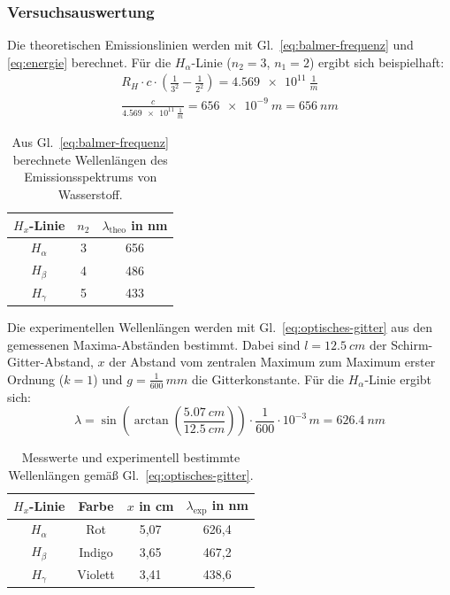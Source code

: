 \subsubsection{Versuchsauswertung}
Die theoretischen Emissionslinien werden mit Gl.~\eqref{eq:balmer-frequenz} und \eqref{eq:energie} berechnet. Für die $H_{\alpha}$-Linie ($n_{2}=3$, $n_1=2$) ergibt sich beispielhaft:
\begin{equation}
  \begin{aligned}
    R_{H} \cdot c \cdot \left(\frac{1}{3^{2}}-\frac{1}{2^{2}} \right) = \SI{4.569e11}{\frac{1}{m}} \\
    \frac{c}{\SI{4.569e11}{\frac{1}{m}}}= \SI{656e-9}{m}=\SI{656}{nm}
  \end{aligned}
\end{equation}

\begin{table}[H]
  \centering
  \caption{Aus Gl.~\eqref{eq:balmer-frequenz} berechnete Wellenlängen des Emissionsspektrums von Wasserstoff.}
  \label{tab:theoretische-werte}
  \begin{tabular}{ c|cc  }
    \hline
    $H_{x}$-Linie & $n_2$ & $\lambda_{\text{theo}}$ in \si{nm} \\
    \hline
    $H_{\alpha}$  & 3     & 656                                \\
    $H_{\beta}$   & 4     & 486                                \\
    $H_{\gamma}$  & 5     & 433                                \\
    \hline
  \end{tabular}
\end{table}

Die experimentellen Wellenlängen werden mit Gl.~\eqref{eq:optisches-gitter} aus den gemessenen Maxima-Abständen bestimmt. Dabei sind $l=\SI{12,5}{cm}$ der Schirm-Gitter-Abstand, $x$ der Abstand vom zentralen Maximum zum Maximum erster Ordnung ($k=1$) und $g = \frac{1}{600}\,\si{mm}$ die Gitterkonstante. Für die $H_{\alpha}$-Linie ergibt sich:
\begin{equation}
  \lambda = \sin\!\left(\arctan\!\left(\frac{\SI{5,07}{cm}}{\SI{12,5}{cm}}\right) \right) \cdot \frac{1}{600}\cdot 10^{-3}\,\si{m} = \SI{626,4}{nm}
\end{equation}

\begin{table}[H]
  \centering
  \caption{Messwerte und experimentell bestimmte Wellenlängen gemäß Gl.~\eqref{eq:optisches-gitter}.}
  \label{tab:gemessene-werte}
  \begin{tabular}{c|ccc}
    \hline
    $H_{x}$-Linie & Farbe   & $x$ in \si{cm} & $\lambda_{\text{exp}}$ in \si{nm} \\
    \hline
    $H_{\alpha}$  & Rot     & 5{,}07         & 626{,}4                           \\
    $H_{\beta}$   & Indigo  & 3{,}65         & 467{,}2                           \\
    $H_{\gamma}$  & Violett & 3{,}41         & 438{,}6                           \\
    \hline
  \end{tabular}
\end{table}

